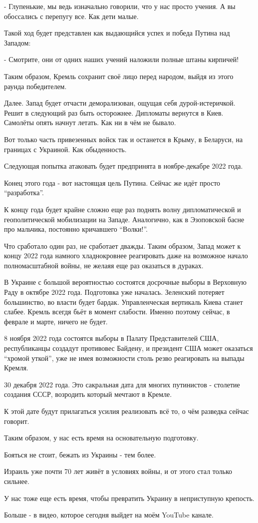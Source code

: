 - Глупенькие, мы ведь изначально говорили, что у нас просто учения. А вы
обоссались с перепугу все. Как дети малые. 

Такой ход будет представлен как выдающийся успех и победа Путина над Западом:

- Смотрите, они от одних наших учений наложили полные штаны кирпичей! 

Таким образом, Кремль сохранит своё лицо перед народом, выйдя из этого раунда
победителем. 

Далее. Запад будет отчасти деморализован, ощущая себя дурой-истеричкой. Решит в
следующий раз быть осторожнее. Дипломаты вернутся в Киев. Самолёты опять начнут
летать. Как ни в чём не бывало. 

Вот только часть привезенных войск так и останется в Крыму, в Беларуси, на
границах с Украиной. Как обыденность.  

Следующая попытка атаковать будет предпринята в ноябре-декабре 2022 года. 

Конец этого года - вот настоящая цель Путина. Сейчас же идёт просто
\enquote{разработка}. 

К концу года будет крайне сложно еще раз поднять волну дипломатической и
геополитической мобилизации на Западе. Аналогично, как в Эзоповской басне про
мальчика, постоянно кричавшего \enquote{Волки!}. 

Что сработало один раз, не сработает дважды. Таким образом, Запад может к концу
2022 года намного хладнокровнее реагировать даже на возможное начало
полномасштабной войны, не желаяя еще раз оказаться в дураках.

В Украине с большой вероятностью состоятся досрочные выборы в Верховную Раду в
октябре 2022 года. Подготовка уже началась. Зеленский потеряет большинство, во
власти будет бардак. Управленческая вертикаль Киева станет слабее. Кремль
всегдя бьёт в момент слабости. Именно поэтому сейчас, в феврале и марте, ничего
не будет.  

8 ноября 2022 года состоятся выборы в Палату Представителей США, республиканцы
создадут противовес Байдену, и президент США может оказаться \enquote{хромой уткой},
уже не имея возможности столь резво реагировать на выпады Кремля. 

30 декабря 2022 года. Это сакральная дата для многих путинистов - столетие
создания СССР, возродить который мечтают в Кремле. 

К этой дате будут прилагаться усилия реализовать всё то, о чём разведка сейчас
говорит. 

Таким образом, у нас есть время на основательную подготовку. 

Бояться не стоит, бежать из Украины - тем более. 

Израиль уже почти 70 лет живёт в условиях войны, и от этого стал только
сильнее. 

У нас тоже еще есть время, чтобы превратить Украину в неприступную крепость. 

Больше - в видео, которое сегодня выйдет на моём YouTube канале.
